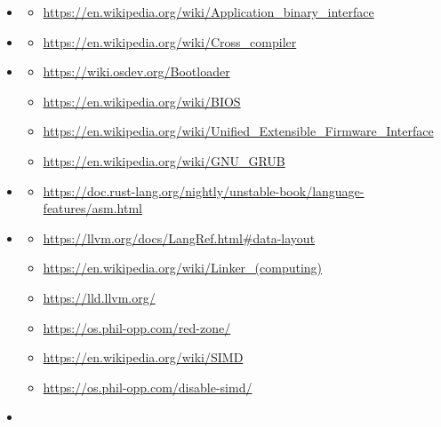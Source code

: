 \documentclass{article}
\begin{document}
\begin{itemize}
    \item \hypertarget{ref:non}{\textbf{\color{medium}{ABI}}}
    \begin{itemize}
        \item \url{https://en.wikipedia.org/wiki/Application_binary_interface}
    \end{itemize}
    \item \hypertarget{ref:non}{\textbf{\color{medium}{Cross Compiler}}}
    \begin{itemize}
        \item \url{https://en.wikipedia.org/wiki/Cross_compiler}
    \end{itemize}
    \item \hypertarget{ref:bootloader}{\textbf{\color{medium}{Bootloader}}}
    \begin{itemize}
       \item \url{https://wiki.osdev.org/Bootloader} 
       \item \url{https://en.wikipedia.org/wiki/BIOS}
       \item \url{https://en.wikipedia.org/wiki/Unified_Extensible_Firmware_Interface}
       \item \url{https://en.wikipedia.org/wiki/GNU_GRUB}
    \end{itemize}
    \item \hypertarget{ref:asm}{\textbf{\color{medium}{ASM}}}
    \begin{itemize}
        \item \url{https://doc.rust-lang.org/nightly/unstable-book/language-features/asm.html}
    \end{itemize}
    \item \hypertarget{ref:target-platform}{\textbf{\color{medium}{Specification of Target Platform}}}
    \begin{itemize}
        \item \url{https://llvm.org/docs/LangRef.html#data-layout}
        \item \url{https://en.wikipedia.org/wiki/Linker_(computing)}
        \item \url{https://lld.llvm.org/}
        \item \url{https://os.phil-opp.com/red-zone/}
        \item \url{https://en.wikipedia.org/wiki/SIMD}
        \item \url{https://os.phil-opp.com/disable-simd/}
    \end{itemize}
    \item \hypertarget{ref:cargo-xbuild}{\textbf{\color{medium}{Core and Compiler Builtins}}}

\end{itemize}
\end{document}
